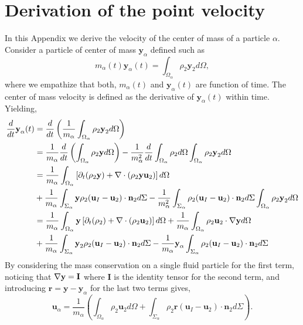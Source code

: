 \section{Derivation of the point velocity}
\label{ap:velocity_definition}
In this Appendix we derive the velocity of the center of mass of a particle $\alpha$. Consider a particle of center of mass $\textbf{y}_\alpha$ defined such as
\begin{equation*}
    m_\alpha(t) \textbf{y}_\alpha(t)
    = \int_{\Omega_\alpha} \rho_2 \textbf{y}_2 d\Omega,
\end{equation*}
where we empathize that both, $m_\alpha(t)$ and $\textbf{y}_\alpha(t)$ are function of time. 
The center of mass velocity is defined as the derivative of $\textbf{y}_\alpha(t)$ within time.
Yielding, 
\begin{align*}
    \frac{d}{d t} \textbf{y}_\alpha (t)
    &=
    \frac{d}{d t} \left(
        \frac{1}{m_\alpha} \int_{\Omega_\alpha} \rho_2 \textbf{y}_2 d\Omega
    \right)\\
    &= \frac{1}{m_\alpha}
    \frac{d}{d t} 
    \left(
        \int_{\Omega_\alpha} \rho_2 \textbf{y} d\Omega
    \right)
    - \frac{1}{m_\alpha^2} \frac{d}{d t} \int_{\Omega_\alpha} \rho_2 d\Omega \int_{\Omega_\alpha} \rho_2 \textbf{y}_2 d\Omega
    \\
    &= \frac{1}{m_\alpha}\int_{\Omega_\alpha} \left[
        \partial_t (\rho_2 \textbf{y}) + \mathbf{\nabla} \cdot\left(\rho_2 \textbf{y}\textbf{u}_2\right) 
    \right]d\Omega \\
    &+ \frac{1}{m_\alpha}\int_{\Sigma_\alpha} \textbf{y} \rho_2(\textbf{u}_I   - \textbf{u}_2) \cdot \textbf{n}_2 d \Sigma
    -  \frac{1}{m_\alpha^2} \int_{\Sigma_\alpha} \rho_2(\textbf{u}_I   - \textbf{u}_2) \cdot \textbf{n}_2 d\Sigma  \int_{\Omega_\alpha} \rho_2 \textbf{y}_2 d\Omega
    \\
    &= \frac{1}{m_\alpha}\int_{\Omega_\alpha} \textbf{y} \left[
    \partial_t (\rho_2) + \mathbf{\nabla} \cdot\left(\rho_2 \textbf{u}_2\right) 
    \right]d\Omega
    + \frac{1}{m_\alpha}\int_{\Omega_\alpha} \rho_2  \textbf{u}_2  \cdot \mathbf{\nabla} \textbf{y} d\Omega \\
    &+ \frac{1}{m_\alpha}\int_{\Sigma_\alpha} \textbf{y}_2 \rho_2 (\textbf{u}_I - \textbf{u}_2) \cdot \textbf{n}_2 d \Sigma
    - \frac{1}{m_\alpha}  \textbf{y}_\alpha \int_{\Sigma_\alpha} \rho_2(\textbf{u}_I   - \textbf{u}_2) \cdot \textbf{n}_2 d\Sigma
\end{align*}
By considering the mass conservation on a single fluid particle for the first term, noticing that $\mathbf{\nabla} \textbf{y} = \textbf{I}$ where $\textbf{I}$ is the identity tensor for the second term, and introducing $\mathbf{r} = \mathbf{y} - \mathbf{y}_\alpha$ for the last two terms gives, 
\begin{equation*}
    \textbf{u}_\alpha
    = \frac{1}{m_\alpha} \left(
        \int_{\Omega_\alpha} \rho_2 \textbf{u}_2 d\Omega
        +  \int_{\Sigma_\alpha} \rho_2 \textbf{r}  (\textbf{u}_I - \textbf{u}_2) \cdot \textbf{n}_2 d\Sigma
    \right).
    \label{eq:vel_def}
\end{equation*}

